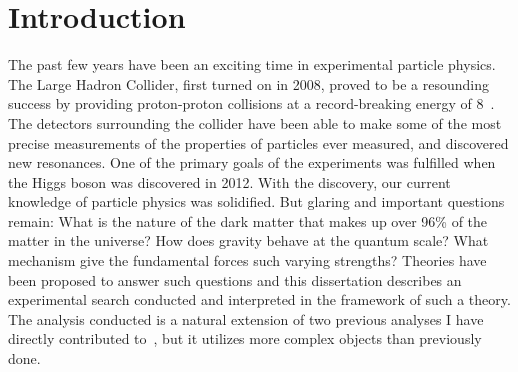 \clearpage
\section{Introduction\label{sec:intro}}

The past few years have been an exciting time in experimental
particle physics. The Large Hadron Collider, first turned on in 2008,
proved to be a resounding success by providing proton-proton collisions
at a record-breaking energy of 8~\TeV. The detectors surrounding the
collider have been able to make some of the most precise measurements
of the properties of particles ever measured, and discovered new resonances. 
One of the primary goals of the experiments was fulfilled when the Higgs 
boson was discovered in 2012. With the discovery, our current knowledge of particle physics was solidified.  
But glaring and important questions remain: What is the nature of the
dark matter that makes up over 96\% of the matter in the universe?
How does gravity behave at the quantum scale? What mechanism give the
fundamental forces such varying strengths? Theories have been proposed
to answer such questions and this dissertation describes an experimental
search conducted and interpreted in the framework of such a theory.
The analysis conducted is a natural extension of two previous analyses I have directly
contributed to~\cite{RA1Paper2011FULL,RA1Paper2012ANHCP}, but it utilizes more 
complex objects than previously done.
